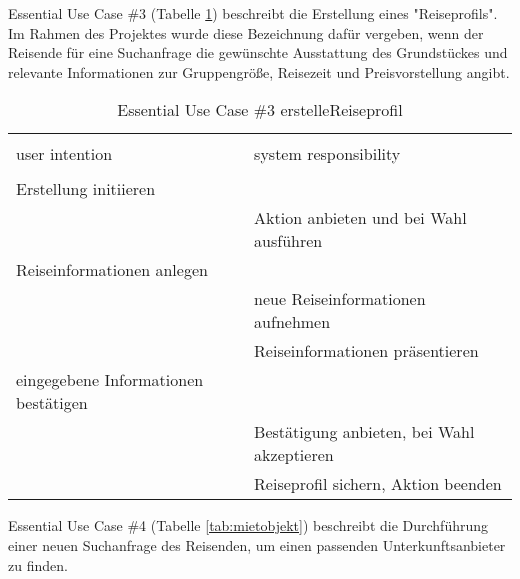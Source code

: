 \newpage
Essential Use Case \#3 (Tabelle \ref{tab:reiseprofil}) beschreibt die Erstellung eines "Reiseprofils". Im Rahmen des Projektes wurde diese Bezeichnung dafür vergeben, wenn der Reisende für eine Suchanfrage die gewünschte Ausstattung des Grundstückes und relevante Informationen zur Gruppengröße, Reisezeit und Preisvorstellung angibt.
\begin{table}[H]
\caption{Essential Use Case \#3 erstelleReiseprofil }
\centering
\begin{tabular}{l l}
\\ [-0.5ex]

\hline\hline
\\ [-0.5ex]
user intention & system responsibility
\\ [1.5ex]
\hline
\\ [-0.5ex]
Erstellung initiieren      &                                 \\[1ex]
                     & Aktion anbieten und bei Wahl ausführen   \\[1ex]
Reiseinformationen anlegen    &                                 \\[1ex] 
                     & neue Reiseinformationen aufnehmen        \\[1ex]
                     & Reiseinformationen präsentieren          \\[1ex]
eingegebene Informationen bestätigen   &                                 \\[1ex]
                     & Bestätigung anbieten, bei Wahl akzeptieren \\[1ex]
                     & Reiseprofil sichern, Aktion beenden      \\[1ex]

\hline
\end{tabular}
\label{tab:reiseprofil}
\end{table}


\newpage
Essential Use Case \#4 (Tabelle \ref{tab:mietobjekt}) beschreibt die Durchführung einer neuen Suchanfrage des Reisenden, um einen passenden Unterkunftsanbieter zu finden.

